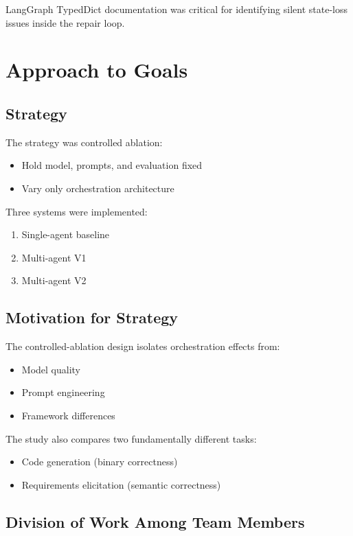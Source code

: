 \documentclass[11pt]{article}
\begin{document}
LangGraph TypedDict documentation was critical for identifying silent state-loss issues inside the repair loop.

\section{Approach to Goals}

\subsection{Strategy}

The strategy was controlled ablation:
\begin{itemize}
    \item Hold model, prompts, and evaluation fixed
    \item Vary only orchestration architecture
\end{itemize}

Three systems were implemented:
\begin{enumerate}
    \item Single-agent baseline
    \item Multi-agent V1
    \item Multi-agent V2
\end{enumerate}

\subsection{Motivation for Strategy}

The controlled-ablation design isolates orchestration effects from:
\begin{itemize}
    \item Model quality
    \item Prompt engineering
    \item Framework differences
\end{itemize}

The study also compares two fundamentally different tasks:
\begin{itemize}
    \item Code generation (binary correctness)
    \item Requirements elicitation (semantic correctness)
\end{itemize}

\subsection{Division of Work Among Team Members}
\end{document}
